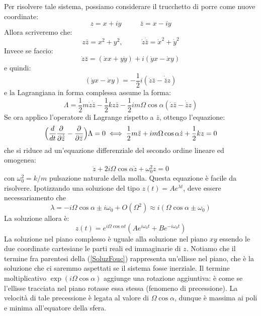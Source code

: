\documentclass[a4paper,openany]{article}
\begin{document}
	Per risolvere tale sistema, possiamo considerare il trucchetto di porre come nuove coordinate:
	$$
	z = x+iy \>\>\>\>\>\>\>\>\>\>\>\> \bar{z} = x-iy
	$$
	Allora scriveremo che:
	$$
	z\bar{z} = x^2 + y^2,  \>\>\>\>\>\>\>\>\>\>\>\>  \dot{z}\dot{\bar{z}} = \dot{x}^2 + \dot{y}^2
	$$
	Invece se faccio:
	$$
	\dot{z}\bar{z} = (\dot{x}x+y\dot{y})+i(\dot{y}x-\dot{x}y)
	$$
	e quindi:
	$$
	(\dot{y}x-\dot{x}y) = -\dfrac{1}{2}i (\dot{z}\bar{z}-\dot{\bar{z}}z)
	$$
	e la Lagrangiana in forma complessa assume la forma:
	$$
	\Lambda = \dfrac{1}{2}m\dot{z}\dot{\bar{z}} - \dfrac{1}{2}kz\bar{z} -\dfrac{1}{2}im\Omega\cos\alpha(\dot{z}\bar{z}-\dot{\bar{z}}z)
	$$
	Se ora applico l'operatore di Lagrange rispetto a $\bar{z}$, ottengo l'equazione:
	$$
	\Bigl(\dfrac{d}{dt}\dfrac{\partial }{\partial \dot{\bar{z}}}-\dfrac{\partial}{\partial \bar{z}}\Bigl)\Lambda = 0 \iff \dfrac{1}{2}m\ddot{z} + im\Omega\cos\alpha\dot{z}+\dfrac{1}{2}kz = 0
	$$
	che si riduce ad un'equazione differenziale del secondo ordine lineare ed omogenea:
	$$
	\ddot{z} + 2i\Omega\cos\alpha \dot{z} +\omega^{2}_{0} z = 0
	$$
	con $\omega_0^2 = k/m$ pulsazione naturale della molla. Questa equazione è facile da risolvere. Ipotizzando una soluzione del tipo $z(t) = Ae^{\lambda t}$, deve essere necessariamento che 
	$$
	\lambda = -i\Omega\cos\alpha \pm i\omega_0 + O(\Omega^{2}) \approx  i(\Omega\cos\alpha \pm \omega_0)
	$$
	La soluzione allora è:
	\begin{equation}
		z(t) = e^{i\Omega\cos\alpha t}(Ae^{i\omega_0 t}+ Be^{-i\omega_0 t})
		\label{SoluzFouc}
	\end{equation}
	La soluzione nel piano complesso è uguale alla soluzione nel piano $xy$ essendo le due coordinate cartesiane le parti reali ed immaginarie di $z$. Notiamo che il termine fra parentesi della (\ref{SoluzFouc}) rappresenta un'ellisse nel piano, che è la soluzione che ci saremmo aspettati se il sistema fosse inerziale. Il termine moltiplicativo $\exp(i\Omega\cos\alpha)$ aggiunge una rotazione aggiuntiva: è come se l'ellisse tracciata nel piano rotasse essa stessa (fenomeno di precessione). La velocità di tale precessione è legata al valore di $\Omega\cos\alpha$, dunque è massima ai poli e minima all'equatore della sfera.
\end{document}
